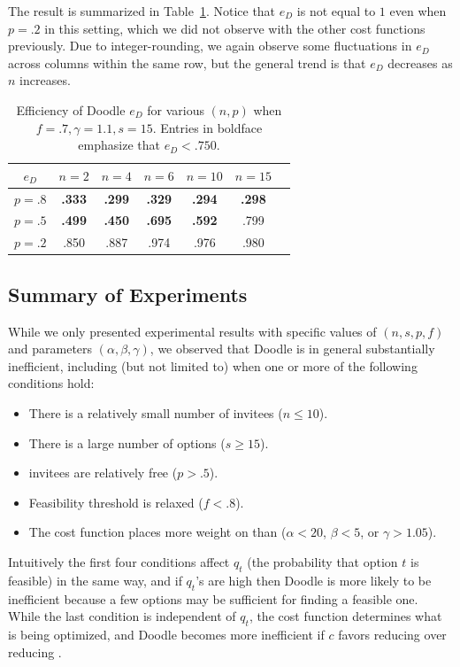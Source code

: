 The result is summarized in Table~\ref{bdoodle:table:DoodleEfficiency-lower-attendance_inconvenience_averse}. Notice that $e_{D}$ is not equal to $1$ even when $p = .2$ in this setting, which we did not observe with the other cost functions previously. Due to integer-rounding, we again observe some fluctuations in $e_{D}$ across columns within the same row, but the general trend is that $e_{D}$ decreases as $n$ increases.
\begin{table}[h]  %
\centering
\begin{tabular}{|c|c|c|c|c|c|c|}
	\hline
	$e_{D}$ & $n = 2$ & $n = 4$ & $n = 6$ & $ n = 10 $ & $n = 15$ \\ \hline
	$p = .8$ & \textbf{.333} & \textbf{.299} & \textbf{.329} & \textbf{.294} & \textbf{.298} \\ \hline
	$p = .5$ & \textbf{.499} & \textbf{.450} & \textbf{.695} & \textbf{.592} & .799  \\ \hline
	$p = .2$ & .850 & .887 & .974 & .976 & .980 \\ \hline
\end{tabular}
\caption{Efficiency of Doodle $e_{D}$ for various $(n, p)$ when $f = .7, \gamma=1.1, s = 15$.
Entries in boldface emphasize that $e_{D} < .750$.
} \label{bdoodle:table:DoodleEfficiency-lower-attendance_inconvenience_averse}
\end{table}


\subsection{Summary of Experiments}
While we only presented experimental results with specific values of $(n, s, p, f)$ and parameters $(\alpha, \beta, \gamma)$, we observed that Doodle is in general substantially inefficient, including (but not limited to) when one or more of the following conditions hold:
\begin{itemize}
	\item There is a relatively small number of invitees ($n \leq 10$).
	\item There is a large number of options ($s \geq 15$).
	\item invitees are relatively free ($p > .5$).
	\item Feasibility threshold is relaxed ($f < .8$).
	\item The cost function places more weight on \Inconveniences than \Times ($\alpha < 20$, $\beta < 5$, or $\gamma > 1.05$).
\end{itemize}
Intuitively the first four conditions affect $q_t$ (the probability that option $t$ is feasible) in the same way, and if $q_t$'s are high then Doodle is more likely to be inefficient because a few options may be sufficient for finding a feasible one. While the last condition is independent of $q_t$, the cost function determines what is being optimized, and Doodle becomes more inefficient if $c$ favors reducing \Inconveniences over reducing \Time.


